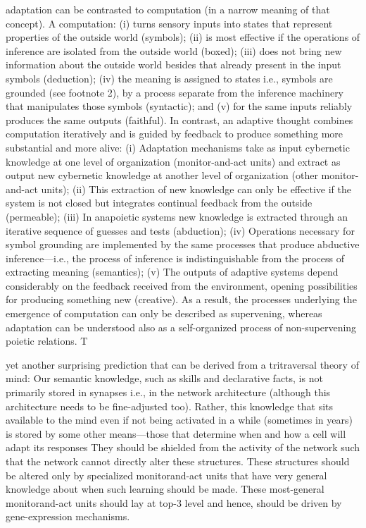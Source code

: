 \documentclass[10pt,a4paper]{article}
\begin{document}
adaptation can be contrasted to computation (in a
narrow meaning of that concept). A computation: (i) turns sensory
inputs into states that represent properties of the outside world
(symbols); (ii) is most effective if the operations of inference are
isolated from the outside world (boxed); (iii) does not bring new
information about the outside world besides that already present
in the input symbols (deduction); (iv) the meaning is assigned
to states i.e., symbols are grounded (see footnote 2), by a process
separate from the inference machinery that manipulates
those symbols (syntactic); and (v) for the same inputs reliably
produces the same outputs (faithful). In contrast, an adaptive
thought combines computation iteratively and is guided by feedback
to produce something more substantial and more alive:
(i) Adaptation mechanisms take as input cybernetic knowledge
at one level of organization (monitor-and-act units) and extract as
output new cybernetic knowledge at another level of organization
(other monitor-and-act units); (ii) This extraction of new knowledge
can only be effective if the system is not closed but integrates
continual feedback from the outside (permeable); (iii) In anapoietic
systems new knowledge is extracted through an iterative
sequence of guesses and tests (abduction); (iv) Operations necessary
for symbol grounding are implemented by the same processes
that produce abductive inference—i.e., the process of
inference is indistinguishable from the process of extracting
meaning (semantics); (v) The outputs of adaptive systems depend
considerably on the feedback received from the environment,
opening possibilities for producing something new (creative). As
a result, the processes underlying the emergence of computation
can only be described as supervening, whereas adaptation can be
understood also as a self-organized process of non-supervening
poietic relations. T


yet
another surprising prediction that can be derived from a tritraversal
theory of mind: Our semantic knowledge, such as
skills and declarative facts, is not primarily stored in synapses
i.e., in the network architecture (although this architecture
needs to be fine-adjusted too). Rather, this knowledge that sits
available to the mind even if not being activated in a while
(sometimes in years) is stored by some other means—those that
determine when and how a cell will adapt its responses
They should be shielded from the activity of the network
such that the network cannot directly alter these structures.
These structures should be altered only by specialized monitorand-act
units that have very general knowledge about when
such learning should be made. These most-general monitorand-act
units should lay at top-3 level and hence, should be
driven by gene-expression mechanisms.


\end{document}
